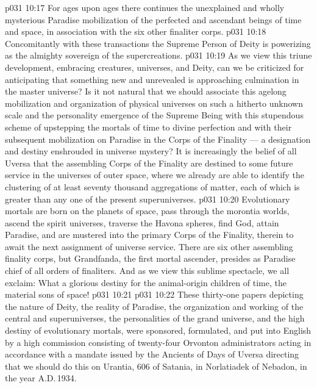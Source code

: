 \vs p031 10:17 \pc {}\bibnobreakspace For ages upon ages there continues the unexplained and wholly mysterious Paradise mobilization of the perfected and ascendant beings of time and space, in association with the six other finaliter corps.
\vs p031 10:18 \pc {}\bibnobreakspace Concomitantly with these transactions the Supreme Person of Deity is powerizing as the almighty sovereign of the supercreations.
\vs p031 10:19 \pc As we view this triune development, embracing creatures, universes, and Deity, can we be criticized for anticipating that something new and unrevealed is approaching culmination in the master universe? Is it not natural that we should associate this agelong mobilization and organization of physical universes on such a hitherto unknown scale and the personality emergence of the Supreme Being with this stupendous scheme of upstepping the mortals of time to divine perfection and with their subsequent mobilization on Paradise in the Corps of the Finality --- a designation and destiny enshrouded in universe mystery? It is increasingly the belief of all Uversa that the assembling Corps of the Finality are destined to some future service in the universes of outer space, where we already are able to identify the clustering of at least seventy thousand aggregations of matter, each of which is greater than any one of the present superuniverses.
\vs p031 10:20 \pc Evolutionary mortals are born on the planets of space, pass through the morontia worlds, ascend the spirit universes, traverse the Havona spheres, find God, attain Paradise, and are mustered into the primary Corps of the Finality, therein to await the next assignment of universe service. There are six other assembling finality corps, but Grandfanda, the first mortal ascender, presides as Paradise chief of all orders of finaliters. And as we view this sublime spectacle, we all exclaim: What a glorious destiny for the animal\hyp{}origin children of time, the material sons of space!
\vsetoff
\vs p031 10:21 
\separatorline
\vs p031 10:22 These thirty\hyp{}one papers depicting the nature of Deity, the reality of Paradise, the organization and working of the central and superuniverses, the personalities of the grand universe, and the high destiny of evolutionary mortals, were sponsored, formulated, and put into English by a high commission consisting of twenty\hyp{}four Orvonton administrators acting in accordance with a mandate issued by the Ancients of Days of Uversa directing that we should do this on Urantia, 606 of Satania, in Norlatiadek of Nebadon, in the year A.D.\,1934.
